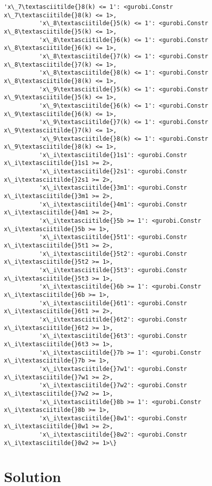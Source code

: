 \documentclass[11pt]{article}
\begin{document}
\begin{Verbatim}[commandchars=\\\{\}]
          'x\_7\textasciitilde{}8(k) <= 1': <gurobi.Constr x\_7\textasciitilde{}8(k) <= 1>,
          'x\_8\textasciitilde{}5(k) <= 1': <gurobi.Constr x\_8\textasciitilde{}5(k) <= 1>,
          'x\_8\textasciitilde{}6(k) <= 1': <gurobi.Constr x\_8\textasciitilde{}6(k) <= 1>,
          'x\_8\textasciitilde{}7(k) <= 1': <gurobi.Constr x\_8\textasciitilde{}7(k) <= 1>,
          'x\_8\textasciitilde{}8(k) <= 1': <gurobi.Constr x\_8\textasciitilde{}8(k) <= 1>,
          'x\_9\textasciitilde{}5(k) <= 1': <gurobi.Constr x\_9\textasciitilde{}5(k) <= 1>,
          'x\_9\textasciitilde{}6(k) <= 1': <gurobi.Constr x\_9\textasciitilde{}6(k) <= 1>,
          'x\_9\textasciitilde{}7(k) <= 1': <gurobi.Constr x\_9\textasciitilde{}7(k) <= 1>,
          'x\_9\textasciitilde{}8(k) <= 1': <gurobi.Constr x\_9\textasciitilde{}8(k) <= 1>,
          'x\_i\textasciitilde{}1s1': <gurobi.Constr x\_i\textasciitilde{}1s1 >= 2>,
          'x\_i\textasciitilde{}2s1': <gurobi.Constr x\_i\textasciitilde{}2s1 >= 2>,
          'x\_i\textasciitilde{}3m1': <gurobi.Constr x\_i\textasciitilde{}3m1 >= 2>,
          'x\_i\textasciitilde{}4m1': <gurobi.Constr x\_i\textasciitilde{}4m1 >= 2>,
          'x\_i\textasciitilde{}5b >= 1': <gurobi.Constr x\_i\textasciitilde{}5b >= 1>,
          'x\_i\textasciitilde{}5t1': <gurobi.Constr x\_i\textasciitilde{}5t1 >= 2>,
          'x\_i\textasciitilde{}5t2': <gurobi.Constr x\_i\textasciitilde{}5t2 >= 1>,
          'x\_i\textasciitilde{}5t3': <gurobi.Constr x\_i\textasciitilde{}5t3 >= 1>,
          'x\_i\textasciitilde{}6b >= 1': <gurobi.Constr x\_i\textasciitilde{}6b >= 1>,
          'x\_i\textasciitilde{}6t1': <gurobi.Constr x\_i\textasciitilde{}6t1 >= 2>,
          'x\_i\textasciitilde{}6t2': <gurobi.Constr x\_i\textasciitilde{}6t2 >= 1>,
          'x\_i\textasciitilde{}6t3': <gurobi.Constr x\_i\textasciitilde{}6t3 >= 1>,
          'x\_i\textasciitilde{}7b >= 1': <gurobi.Constr x\_i\textasciitilde{}7b >= 1>,
          'x\_i\textasciitilde{}7w1': <gurobi.Constr x\_i\textasciitilde{}7w1 >= 2>,
          'x\_i\textasciitilde{}7w2': <gurobi.Constr x\_i\textasciitilde{}7w2 >= 1>,
          'x\_i\textasciitilde{}8b >= 1': <gurobi.Constr x\_i\textasciitilde{}8b >= 1>,
          'x\_i\textasciitilde{}8w1': <gurobi.Constr x\_i\textasciitilde{}8w1 >= 2>,
          'x\_i\textasciitilde{}8w2': <gurobi.Constr x\_i\textasciitilde{}8w2 >= 1>\}
\end{Verbatim}
        
    \section{Solution}\label{solution}
\end{document}

